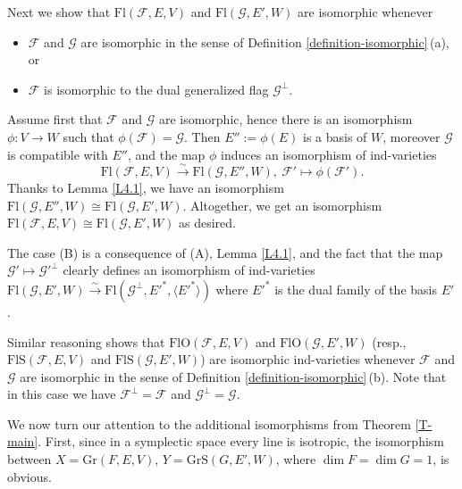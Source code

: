 \documentclass[12pt]{amsart}
\newcommand{\Flags}{\mathrm{Fl}}
\newcommand{\Grass}{\mathrm{Gr}}
\newcommand{\OFlags}{\mathrm{FlO}}
\newcommand{\SFlags}{\mathrm{FlS}}
\newcommand{\SGrass}{\mathrm{GrS}}
\theoremstyle{definition}
\begin{document}

Next we show that $\Flags(\mathcal{F},E,V)$ and $\Flags(\mathcal{G},E',W)$ 
are isomorphic whenever
\begin{itemize}
\item[\rm (A)] $\mathcal{F}$ and $\mathcal{G}$ are isomorphic in the sense of Definition \ref{definition-isomorphic}\,(a), or
\item[\rm (B)] $\mathcal{F}$ is isomorphic to the dual generalized flag $\mathcal{G}^\perp$.
\end{itemize}

Assume first that $\mathcal{F}$ and $\mathcal{G}$ are isomorphic, hence there is an isomorphism $\phi:V\to W$ such that $\phi(\mathcal{F})=\mathcal{G}$. Then $E'':=\phi(E)$ is a basis of $W$, moreover $\mathcal{G}$ is compatible with $E''$, and the map $\phi$ induces an isomorphism of ind-varieties
$$
\Flags(\mathcal{F},E,V)\stackrel{\sim}{\to} \Flags(\mathcal{G},E'',W),\ \mathcal{F}'\mapsto \phi(\mathcal{F}').
$$
Thanks to Lemma \ref{L4.1}, we have an isomorphism $\Flags(\mathcal{G},E'',W)\cong\Flags(\mathcal{G},E',W)$. Altogether, we get an isomorphism $\Flags(\mathcal{F},E,V)\cong\Flags(\mathcal{G},E',W)$ as desired.

The case (B) is a consequence of (A), Lemma \ref{L4.1}, and the fact that the map $\mathcal{G'}\mapsto\mathcal{G}'^\perp$
clearly defines an isomorphism of ind-varieties $\Flags(\mathcal{G},E',W)\stackrel{\sim}{\to} \Flags(\mathcal{G}^\perp,E'^*,\langle E'^*\rangle)$ where $E'^*$ is the dual family of the basis $E'$.

Similar reasoning shows that $\OFlags(\mathcal{F},E,V)$ and $\OFlags(\mathcal{G},E',W)$
(resp.,  $\SFlags(\mathcal{F},E,V)$ and $\SFlags(\mathcal{G},E',W)$) are isomorphic ind-varieties whenever $\mathcal{F}$ and $\mathcal{G}$ are isomorphic in the sense of Definition \ref{definition-isomorphic}\,(b). Note that in this case we have $\mathcal{F}^\perp=\mathcal{F}$ and $\mathcal{G}^\perp=\mathcal{G}$.

\medskip

We now turn our attention to the additional isomorphisms from Theorem \ref{T-main}.
First, since in a symplectic space every line is isotropic, the isomorphism
between $X=\Grass(F,E,V)$, $Y=\SGrass(G,E',W)$, where $\dim F=\dim G=1$, is obvious.
\end{document}

